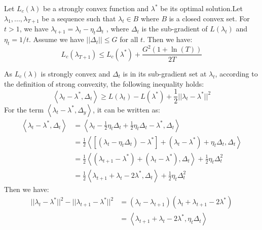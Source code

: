 \begin{theorem}
Let $L_c(\lambda)$ be a strongly convex function and $\lambda^*$ be its optimal solution.Let $\lambda_1,...,\lambda_{T+1}$ be a sequence such that $\lambda_t \in B$ where $B$ is a closed convex set. For $t>1$, we have $\lambda_{t+1} = \lambda_t - \eta_t \Delta_t$ , where $\Delta_t$ is the sub-gradient of $L(\lambda_t)$ and $\eta_t = 1/t$. Assume we have $||\Delta_t|| \leq G$ for all $t$. Then we have:	
	\begin{equation}
	L_c(\lambda_{T+1}) \leq L_c(\lambda^*)+\frac{G^2(1+\ln (T))}{2T}
	\end{equation}
\end{theorem}
	As $L_c(\lambda)$ is strongly convex and $\Delta_t$ is in its sub-gradient set at $\lambda_t$, according to the definition of strong convexity, the following inequality holds:	
	\begin{equation}\label{eq:app:strong}
		\left\langle {\lambda_t - \lambda^*,\Delta_t} \right\rangle \geq L(\lambda_t)-L(\lambda^*)+\frac{1}{2}||\lambda_t - \lambda^*||^2
	\end{equation} 
	For the term $\left\langle {\lambda_t - \lambda^*,\Delta_y} \right\rangle$, it can be written as:	
	\begin{equation} \label{eq:app:inner}
	\begin{aligned}
	\left\langle {\lambda_t - \lambda^*,\Delta_t} \right\rangle &= \left\langle {\lambda_t - \frac{1}{2}\eta_t\Delta_t + \frac{1}{2}\eta_t\Delta_t- \lambda^*,\Delta_t} \right\rangle\\
	&=\frac{1}{2}\left\langle {\left[ {\left( {{\lambda _t} - {\eta _t}{\Delta _t}} \right) - {\lambda ^*}} \right] + \left( {{\lambda _t} - {\lambda ^*}} \right) + {\eta _t}{\Delta _t},{\Delta _t}} \right\rangle \\
	&= \frac{1}{2}\left\langle {\left( {{\lambda _{t + 1}} - {\lambda ^*}} \right) + \left( {{\lambda _t} - {\lambda ^*}} \right),{\Delta _t}} \right\rangle  + \frac{1}{2}{\eta _t}\Delta _t^2\\
	&=\frac{1}{2}\left\langle {{\lambda _{t + 1}} + {\lambda _t} - 2{\lambda ^*},{\Delta _t}} \right\rangle  + \frac{1}{2}{\eta _t}\Delta _t^2
	\end{aligned}
	\end{equation}	
	Then we have:
	\begin{equation}\label{eq:app:squrediff}
	\begin{aligned}
	||\lambda_t-\lambda^*||^2-||\lambda_{t+1}-\lambda^*||^2 &= ( {{\lambda _t} - {\lambda _{t + 1}}})  ({{\lambda _t} + {\lambda _{t + 1}} - 2{\lambda ^*}}) \\
	&=\left\langle {{\lambda _{t + 1}} + {\lambda _t} - 2{\lambda ^*},{\eta_t\Delta _t}} \right\rangle
	\end{aligned}
	\end{equation}
